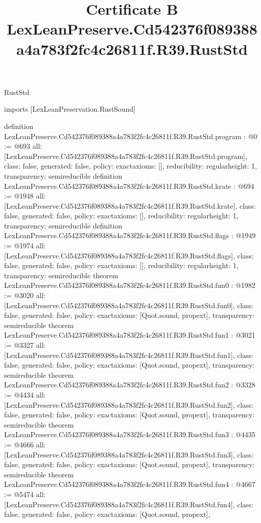 \begin{lexlean}{RustStd}
\title{Certificate B LexLeanPreserve.Cd542376f089388a4a783f2fc4c26811f.R39.RustStd}
\begin{coremodule}
imports [LexLeanPreservation.RustSound]

definition LexLeanPreserve.Cd542376f089388a4a783f2fc4c26811f.R39.RustStd.program : @0 := @693 {
  all: [LexLeanPreserve.Cd542376f089388a4a783f2fc4c26811f.R39.RustStd.program],
  class: false,
  generated: false,
  policy: exact{axioms: []},
  reducibility: regular{height: 1},
  transparency: semireducible
}
definition LexLeanPreserve.Cd542376f089388a4a783f2fc4c26811f.R39.RustStd.krate : @694 := @1948 {
  all: [LexLeanPreserve.Cd542376f089388a4a783f2fc4c26811f.R39.RustStd.krate],
  class: false,
  generated: false,
  policy: exact{axioms: []},
  reducibility: regular{height: 1},
  transparency: semireducible
}
definition LexLeanPreserve.Cd542376f089388a4a783f2fc4c26811f.R39.RustStd.flags : @1949 := @1974 {
  all: [LexLeanPreserve.Cd542376f089388a4a783f2fc4c26811f.R39.RustStd.flags],
  class: false,
  generated: false,
  policy: exact{axioms: []},
  reducibility: regular{height: 1},
  transparency: semireducible
}
theorem LexLeanPreserve.Cd542376f089388a4a783f2fc4c26811f.R39.RustStd.fun0 : @1982 := @3020 {
  all: [LexLeanPreserve.Cd542376f089388a4a783f2fc4c26811f.R39.RustStd.fun0],
  class: false,
  generated: false,
  policy: exact{axioms: [Quot.sound, propext]},
  transparency: semireducible
}
theorem LexLeanPreserve.Cd542376f089388a4a783f2fc4c26811f.R39.RustStd.fun1 : @3021 := @3327 {
  all: [LexLeanPreserve.Cd542376f089388a4a783f2fc4c26811f.R39.RustStd.fun1],
  class: false,
  generated: false,
  policy: exact{axioms: [Quot.sound, propext]},
  transparency: semireducible
}
theorem LexLeanPreserve.Cd542376f089388a4a783f2fc4c26811f.R39.RustStd.fun2 : @3328 := @4434 {
  all: [LexLeanPreserve.Cd542376f089388a4a783f2fc4c26811f.R39.RustStd.fun2],
  class: false,
  generated: false,
  policy: exact{axioms: [Quot.sound, propext]},
  transparency: semireducible
}
theorem LexLeanPreserve.Cd542376f089388a4a783f2fc4c26811f.R39.RustStd.fun3 : @4435 := @4666 {
  all: [LexLeanPreserve.Cd542376f089388a4a783f2fc4c26811f.R39.RustStd.fun3],
  class: false,
  generated: false,
  policy: exact{axioms: [Quot.sound, propext]},
  transparency: semireducible
}
theorem LexLeanPreserve.Cd542376f089388a4a783f2fc4c26811f.R39.RustStd.fun4 : @4667 := @5474 {
  all: [LexLeanPreserve.Cd542376f089388a4a783f2fc4c26811f.R39.RustStd.fun4],
  class: false,
  generated: false,
  policy: exact{axioms: [Quot.sound, propext]},
}
\end{coremodule}
\end{lexlean}
